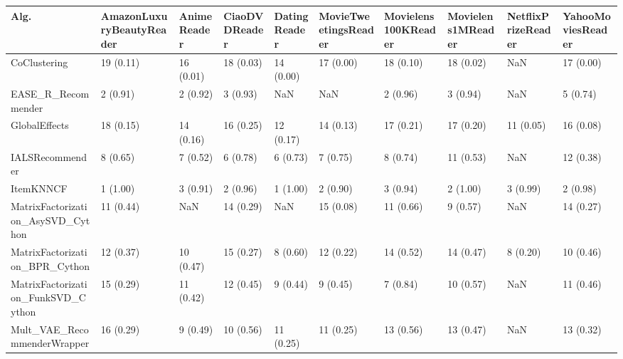 \begin{tabular}{llllllllll}
\toprule
                               Alg. & AmazonLuxuryBeautyReader & AnimeReader & CiaoDVDReader & DatingReader & MovieTweetingsReader & Movielens100KReader & Movielens1MReader & NetflixPrizeReader & YahooMoviesReader \\
\midrule
                       CoClustering &                19 (0.11) &   16 (0.01) &     18 (0.03) &    14 (0.00) &            17 (0.00) &           18 (0.10) &         18 (0.02) &                NaN &         17 (0.00) \\
                 EASE\_R\_Recommender &                 2 (0.91) &    2 (0.92) &      3 (0.93) &          NaN &                  NaN &            2 (0.96) &          3 (0.94) &                NaN &          5 (0.74) \\
                      GlobalEffects &                18 (0.15) &   14 (0.16) &     16 (0.25) &    12 (0.17) &            14 (0.13) &           17 (0.21) &         17 (0.20) &          11 (0.05) &         16 (0.08) \\
                    IALSRecommender &                 8 (0.65) &    7 (0.52) &      6 (0.78) &     6 (0.73) &             7 (0.75) &            8 (0.74) &         11 (0.53) &                NaN &         12 (0.38) \\
                          ItemKNNCF &                 1 (1.00) &    3 (0.91) &      2 (0.96) &     1 (1.00) &             2 (0.90) &            3 (0.94) &          2 (1.00) &           3 (0.99) &          2 (0.98) \\
  MatrixFactorization\_AsySVD\_Cython &                11 (0.44) &         NaN &     14 (0.29) &          NaN &            15 (0.08) &           11 (0.66) &          9 (0.57) &                NaN &         14 (0.27) \\
     MatrixFactorization\_BPR\_Cython &                12 (0.37) &   10 (0.47) &     15 (0.27) &     8 (0.60) &            12 (0.22) &           14 (0.52) &         14 (0.47) &           8 (0.20) &         10 (0.46) \\
 MatrixFactorization\_FunkSVD\_Cython &                15 (0.29) &   11 (0.42) &     12 (0.45) &     9 (0.44) &             9 (0.45) &            7 (0.84) &         10 (0.57) &                NaN &         11 (0.46) \\
        Mult\_VAE\_RecommenderWrapper &                16 (0.29) &    9 (0.49) &     10 (0.56) &    11 (0.25) &            11 (0.25) &           13 (0.56) &         13 (0.47) &                NaN &         13 (0.32) \\

\end{tabular}
